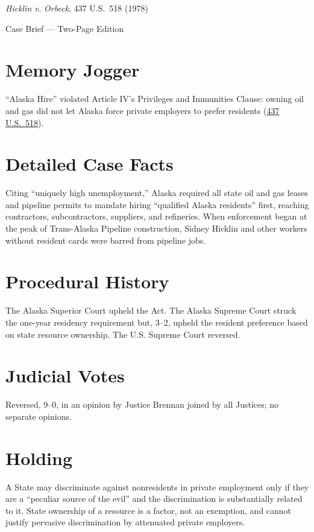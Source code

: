 \documentclass[12pt]{article}
\begin{document}
\begin{center}
{\LARGE \textit{Hicklin v. Orbeck}, 437 U.S.\ 518 (1978)\par}
\vspace{0.5em}
{\large Case Brief --- Two-Page Edition\par}
\end{center}

\section{Memory Jogger}
``Alaska Hire'' violated Article IV's Privileges and Immunities Clause: owning oil and gas did not let Alaska force private employers to prefer residents (\href{https://supreme.justia.com/cases/federal/us/437/518/}{437 U.S.\ 518}).

\section{Detailed Case Facts}
Citing ``uniquely high unemployment,'' Alaska required all state oil and gas leases and pipeline permits to mandate hiring ``qualified Alaska residents'' first, reaching contractors, subcontractors, suppliers, and refineries. When enforcement began at the peak of Trans-Alaska Pipeline construction, Sidney Hicklin and other workers without resident cards were barred from pipeline jobs.

\section{Procedural History}
The Alaska Superior Court upheld the Act. The Alaska Supreme Court struck the one-year residency requirement but, 3--2, upheld the resident preference based on state resource ownership. The U.S. Supreme Court reversed.

\section{Judicial Votes}
Reversed, 9--0, in an opinion by Justice Brennan joined by all Justices; no separate opinions.

\section{Holding}
A State may discriminate against nonresidents in private employment only if they are a ``peculiar source of the evil'' and the discrimination is substantially related to it. State ownership of a resource is a factor, not an exemption, and cannot justify pervasive discrimination by attenuated private employers.
\end{document}
